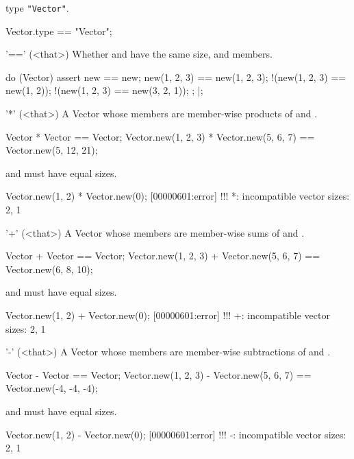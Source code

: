 \begin{urbiscriptapi}
\item[type]%
  \lstinline|"Vector"|.
\begin{urbiassert}
Vector.type == "Vector";
\end{urbiassert}

\item['=='](<that>)%
  Whether \this and \that have the same size, and members.
\begin{urbiscript}
do (Vector)
{
  assert
  {
               new == new;
      new(1, 2, 3) == new(1, 2, 3);
    !(new(1, 2, 3) == new(1, 2));
    !(new(1, 2, 3) == new(3, 2, 1));
  };
}|;
\end{urbiscript}

\item['*'](<that>)%
  A Vector whose members are member-wise products of \this and \that.
\begin{urbiassert}
Vector              * Vector              == Vector;
Vector.new(1, 2, 3) * Vector.new(5, 6, 7) == Vector.new(5, 12, 21);
\end{urbiassert}
  \this and \that must have equal sizes.
\begin{urbiscript}
Vector.new(1, 2) * Vector.new(0);
[00000601:error] !!! *: incompatible vector sizes: 2, 1
\end{urbiscript}

\item['+'](<that>)%
  A Vector whose members are member-wise sums of \this and \that.
\begin{urbiassert}
Vector              + Vector              == Vector;
Vector.new(1, 2, 3) + Vector.new(5, 6, 7) == Vector.new(6, 8, 10);
\end{urbiassert}
  \this and \that must have equal sizes.
\begin{urbiscript}
Vector.new(1, 2) + Vector.new(0);
[00000601:error] !!! +: incompatible vector sizes: 2, 1
\end{urbiscript}

\item['-'](<that>)%
  A Vector whose members are member-wise subtractions of \this and \that.
\begin{urbiassert}
Vector              - Vector              == Vector;
Vector.new(1, 2, 3) - Vector.new(5, 6, 7) == Vector.new(-4, -4, -4);
\end{urbiassert}
  \this and \that must have equal sizes.
\begin{urbiscript}
Vector.new(1, 2) - Vector.new(0);
[00000601:error] !!! -: incompatible vector sizes: 2, 1
\end{urbiscript}


\end{urbiscriptapi}
